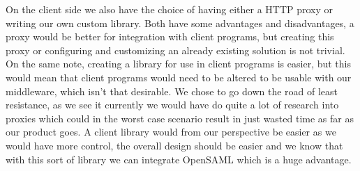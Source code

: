         On the client side we also have the choice of having either a HTTP proxy or writing our own custom library. Both have some advantages and disadvantages, a proxy would be better for integration with client programs, but creating this proxy or configuring and customizing an already existing solution is not trivial. On the same note, creating a library for use in client programs is easier, but this would mean that client programs would need to be altered to be usable with our middleware, which isn’t that desirable. We chose to go down the road of least resistance, as we see it currently we would have do quite a lot of research into proxies which could in the worst case scenario result in just wasted time as far as our product goes. A client library would from our perspective be easier as we would have more control, the overall design should be easier and we know that with this sort of library we can integrate OpenSAML which is a huge advantage.  
          
